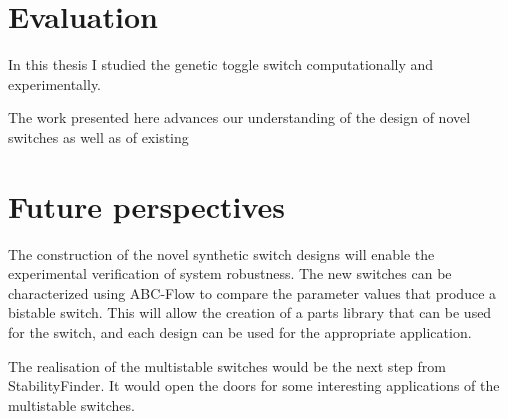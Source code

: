 \section{Evaluation}


In this thesis I studied the genetic toggle switch computationally and experimentally. 



The work presented here advances our understanding of the design of novel switches as well as of existing


\section{Future perspectives}

The construction of the novel synthetic switch designs will enable the experimental verification of system robustness. The new switches can be characterized using ABC-Flow to compare the parameter values that produce a bistable switch. This will allow the creation of a parts library that can be used for the switch, and each design can be used for the appropriate application.

The realisation of the multistable switches would be the next step from StabilityFinder. It would open the doors for some interesting applications of the multistable switches.

